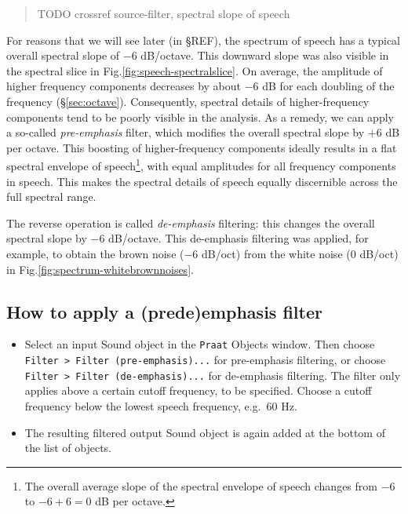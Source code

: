 \documentclass[
]{book}
\begin{document}
\begin{quote}
TODO crossref source-filter, spectral slope of speech
\end{quote}

For reasons that we will see later (in §REF), the spectrum of speech has a typical overall spectral slope of \(-6\) dB/octave. This downward slope was also visible in the spectral slice in Fig.\ref{fig:speech-spectralslice}. On average, the amplitude of higher frequency components decreases by about \(-6\) dB for each doubling of the frequency (§\ref{sec:octave}).
Consequently, spectral details of higher-frequency components tend to be poorly visible in the analysis. As a remedy, we can apply a so-called \emph{pre-emphasis} filter, which modifies the overall spectral slope by \(+6\) dB per octave. This boosting of higher-frequency components ideally results in a flat spectral envelope of speech\footnote{The overall average slope of the spectral envelope of speech changes from \(-6\) to \(-6+6=0\) dB per octave.}, with equal amplitudes for all frequency components in speech. This makes the spectral details of speech equally discernible across the full spectral range.

The reverse operation is called \emph{de-emphasis} filtering: this changes the overall spectral slope by \(-6\) dB/octave. This de-emphasis filtering was applied, for example, to obtain the brown noise (\(-6\) dB/oct) from the white noise (\(0\) dB/oct) in Fig.\ref{fig:spectrum-whitebrownnoises}.

\label{box-praatemphasis}
\subsection{How to apply a (pre\textbar de)emphasis filter}\label{how-to-apply-a-predeemphasis-filter}

\begin{itemize}
\item
  Select an input Sound object in the \texttt{Praat} Objects window. Then choose \texttt{Filter\ \textgreater{}\ Filter\ (pre-emphasis)...} for pre-emphasis filtering, or choose \texttt{Filter\ \textgreater{}\ Filter\ (de-emphasis)...} for de-emphasis filtering. The filter only applies above a certain cutoff frequency, to be specified. Choose a cutoff frequency below the lowest speech frequency, e.g.~60 Hz.
\item
  The resulting filtered output Sound object is again added at the bottom of the list of objects.
\end{itemize}
\end{document}
